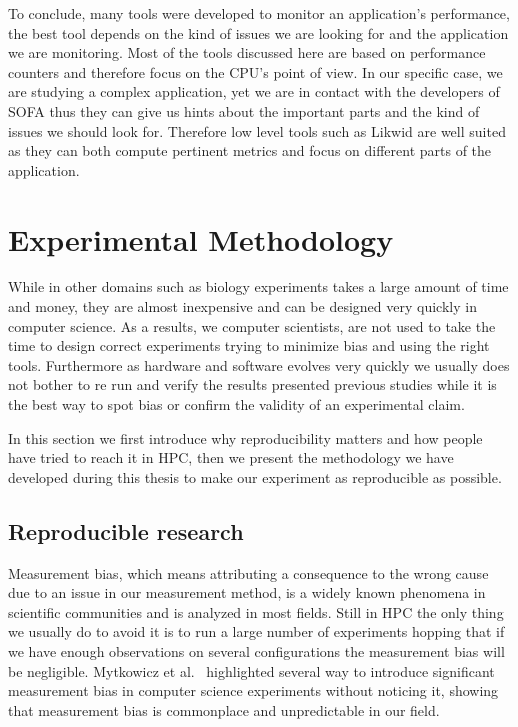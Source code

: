 To conclude, many tools were developed to monitor an application's performance, the best tool depends on the kind of issues we are looking for and the application we are monitoring.
Most of the tools discussed here are based on performance counters and therefore focus on the \gls{CPU}'s point of view.
In our specific case, we are studying a complex application, yet we are in contact with the developers of \gls{SOFA} thus they can give us hints about the important parts and the kind of issues we should look for.
Therefore low level tools such as \gls{Likwid} are well suited as they can both compute pertinent metrics and focus on different parts of the application.

\section{Experimental Methodology}
\label{sec:expe-methodo}

While in other domains such as biology experiments takes a large amount of time and money, they are almost inexpensive and can be designed very quickly in computer science.
As a results, we computer scientists, are not used to take the time to design correct experiments trying to minimize bias and using the right tools.
Furthermore as hardware and software evolves very quickly we usually does not bother to re run and verify the results presented previous studies while it is the best way to spot bias or confirm the validity of an experimental claim.

In this section we first introduce why reproducibility matters and how people have tried to reach it in \gls{HPC}, then we present the methodology we have developed during this thesis to make our experiment as reproducible as possible.


\subsection{Reproducible research}

Measurement bias, which means attributing a consequence to the wrong cause due to an issue in our measurement method, is a widely known phenomena in scientific communities and is analyzed in most fields.
Still in \gls{HPC} the only thing we usually do to avoid it is to run a large number of experiments hopping that if we have enough observations on several configurations the measurement bias will be negligible.
Mytkowicz et al.~\cite{Mytkowicz09Producing} highlighted several way to introduce significant measurement bias in computer science experiments without noticing it, showing that measurement bias is commonplace and unpredictable in our field.

